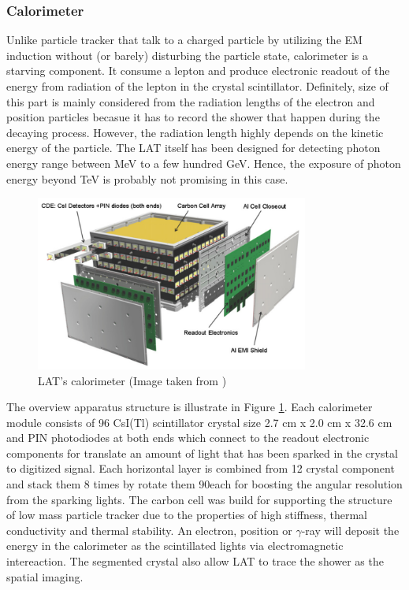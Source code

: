 \subsubsection{Calorimeter}
Unlike particle tracker that talk to a charged particle by utilizing
the EM induction without (or barely) disturbing the particle state,
calorimeter is a starving component. It consume a lepton and produce 
electronic readout of the energy from radiation of the lepton in the
crystal scintillator. Definitely, size of this part is mainly considered 
from the radiation lengths of the electron and position particles becasue it 
has to record the shower that happen during the decaying process.
However, the radiation length highly depends on the kinetic energy 
of the particle. The LAT itself has been designed for detecting photon 
energy range between MeV to a few hundred GeV. Hence, the exposure of 
photon energy beyond TeV is probably not promising in this case.


\begin{figure}[h]
    \centering
    \includegraphics[width=0.8\textwidth]{content/background/figures/fermi_calorimeter.png}
    \caption{LAT's calorimeter (Image taken from \cite{FermiLAT})}
    \label{fig:fermi_calorimeter}
\end{figure}

The overview apparatus structure is illustrate in Figure \ref{fig:fermi_calorimeter}.
Each calorimeter module consists of 96 CsI(Tl) scintillator crystal size 
2.7 cm x 2.0 cm x 32.6 cm and PIN photodiodes at both ends which connect 
to the readout electronic components for translate an amount of light 
that has been sparked in the crystal to digitized signal. Each horizontal 
layer is combined from 12 crystal component and stack them 8 times by 
rotate them 90\textdegree each for boosting the angular resolution 
from the sparking lights. The carbon cell was build for supporting 
the structure of low mass particle tracker due to the properties of 
high stiffness, thermal conductivity and thermal stability.
An electron, position or $\gamma$-ray will deposit the energy in the
calorimeter as the scintillated lights via electromagnetic intereaction.
The segmented crystal also allow LAT to trace the shower
as the spatial imaging.


